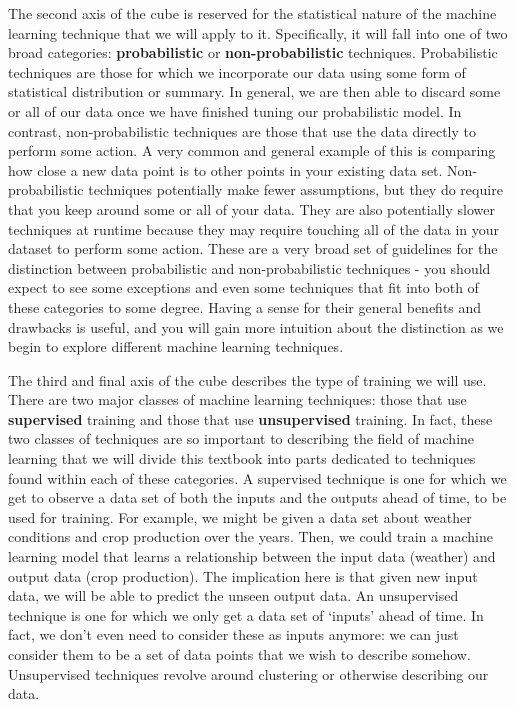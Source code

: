 The second axis of the cube is reserved for the statistical nature of the machine learning technique that we will apply to it. Specifically, it will fall into one of two broad categories: \textbf{probabilistic} or \textbf{non-probabilistic} techniques. Probabilistic techniques are those for which we incorporate our data using some form of statistical distribution or summary. In general, we are then able to discard some or all of our data once we have finished tuning our probabilistic model. In contrast, non-probabilistic techniques are those that use the data directly to perform some action. A very common and general example of this is comparing how close a new data point is to other points in your existing data set. Non-probabilistic techniques potentially make fewer assumptions, but they do require that you keep around some or all of your data. They are also potentially slower techniques at runtime because they may require touching all of the data in your dataset to perform some action. These are a very broad set of guidelines for the distinction between probabilistic and non-probabilistic techniques - you should expect to see some exceptions and even some techniques that fit into both of these categories to some degree. Having a sense for their general benefits and drawbacks is useful, and you will gain more intuition about the distinction as we begin to explore different machine learning techniques.

The third and final axis of the cube describes the type of training we will use. There are two major classes of machine learning techniques: those that use \textbf{supervised} training and those that use \textbf{unsupervised} training. In fact, these two classes of techniques are so important to describing the field of machine learning that we will divide this textbook into parts dedicated to techniques found within each of these categories. A supervised technique is one for which we get to observe a data set of both the inputs and the outputs ahead of time, to be used for training. For example, we might be given a data set about weather conditions and crop production over the years. Then, we could train a machine learning model that learns a relationship between the input data (weather) and output data (crop production). The implication here is that given new input data, we will be able to predict the unseen output data. An unsupervised technique is one for which we only get a data set of `inputs' ahead of time. In fact, we don't even need to consider these as inputs anymore: we can just consider them to be a set of data points that we wish to describe somehow. Unsupervised techniques revolve around clustering or otherwise describing our data.

